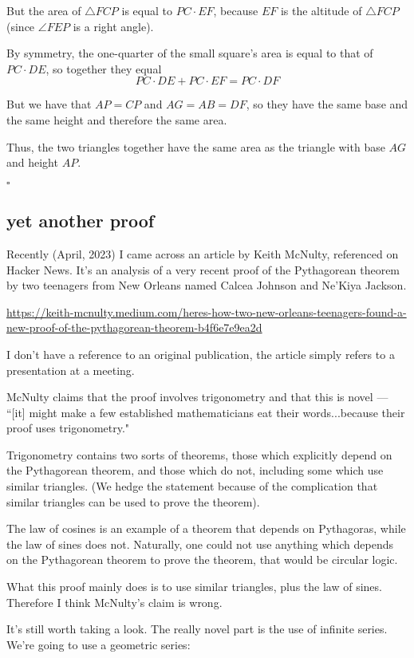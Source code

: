\documentclass[11pt, oneside]{article}
\begin{document}
But the area of $\triangle FCP$ is equal to $PC \cdot EF$, because $EF$ is the altitude of $\triangle FCP$ (since $\angle FEP$ is a right angle).

By symmetry, the one-quarter of the small square's area is equal to that of $PC \cdot DE$, so together they equal 
\[ PC \cdot DE + PC \cdot EF = PC \cdot DF \]

But we have that $AP = CP$ and $AG = AB = DF$, so they have the same base and the same height and therefore the same area.  

Thus, the two triangles together have the same area as the triangle with base $AG$ and height $AP$.

$\square$

\subsection*{yet another proof}

Recently (April, 2023) I came across an article by Keith McNulty, referenced on Hacker News.  It's an analysis of a very recent proof of the Pythagorean theorem by two teenagers from New Orleans named Calcea Johnson and Ne'Kiya Jackson.

\url{https://keith-mcnulty.medium.com/heres-how-two-new-orleans-teenagers-found-a-new-proof-of-the-pythagorean-theorem-b4f6e7e9ea2d}

I don't have a reference to an original publication, the article simply refers to a presentation at a meeting.  

McNulty claims that the proof involves trigonometry and that this is novel --- ``[it] might make a few established mathematicians eat their words...because their proof uses trigonometry."

Trigonometry contains two sorts of theorems, those which explicitly depend on the Pythagorean theorem, and those which do not, including some which use similar triangles.  (We hedge the statement because of  the complication that similar triangles can be used to prove the theorem).

The law of cosines is an example of a theorem that depends on Pythagoras, while the law of sines does not.  Naturally, one could not use anything which depends on the Pythagorean theorem to prove the theorem, that would be circular logic.

What this proof mainly does is to use similar triangles, plus the law of sines.  Therefore I think McNulty's claim is wrong. 

 It's still worth taking a look.  The really novel part is the use of infinite series.  We're going to use a geometric series:
 
\end{document}

